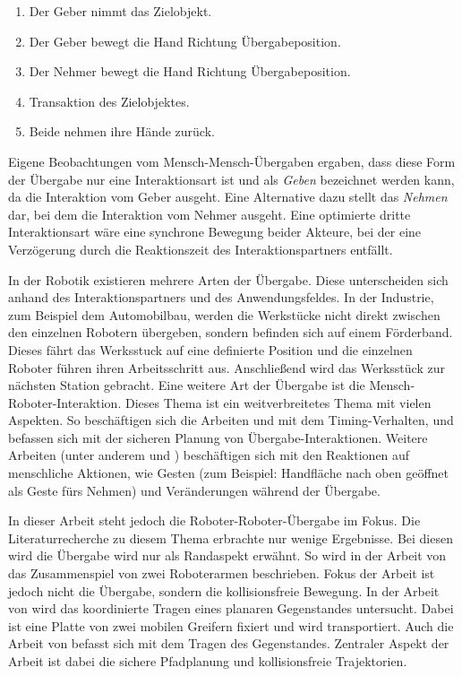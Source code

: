 \begin{enumerate}
	\item Der Geber nimmt das Zielobjekt.
	\item Der Geber bewegt die Hand Richtung Übergabeposition.
	\item Der Nehmer bewegt die Hand Richtung Übergabeposition.
	\item Transaktion des Zielobjektes.
	\item Beide nehmen ihre Hände zurück.
\end{enumerate}

Eigene Beobachtungen vom Mensch-Mensch-Übergaben ergaben, dass diese Form der Übergabe nur eine Interaktionsart ist und als \textit{Geben} bezeichnet werden kann, da die Interaktion vom Geber ausgeht. Eine Alternative dazu stellt das \textit{Nehmen} dar, bei dem die Interaktion vom Nehmer ausgeht. Eine optimierte dritte Interaktionsart wäre eine synchrone Bewegung beider Akteure, bei der eine Verzögerung durch die Reaktionszeit des Interaktionspartners entfällt.

In der Robotik existieren mehrere Arten der Übergabe. Diese unterscheiden sich anhand des Interaktionspartners und des Anwendungsfeldes. 
In der Industrie, zum Beispiel dem Automobilbau, werden die Werkstücke nicht direkt zwischen den einzelnen Robotern übergeben, sondern befinden sich auf einem Förderband. Dieses fährt das Werksstuck auf eine definierte Position und die einzelnen Roboter führen ihren Arbeitsschritt aus. Anschließend wird das Werksstück zur nächsten Station gebracht. Eine weitere Art der Übergabe ist die Mensch-Roboter-Interaktion. Dieses Thema ist ein weitverbreitetes Thema mit vielen Aspekten. So beschäftigen sich die Arbeiten \cite{huber2008human} und \cite{shibata1995experimental} mit dem Timing-Verhalten, \cite{mainprice2010planning} und \cite{kulic2005safe} befassen sich mit der sicheren Planung von Übergabe-Interaktionen. Weitere Arbeiten (unter anderem \cite{prada2014implementation} und \cite{basiliapproach}) beschäftigen sich mit den Reaktionen auf menschliche Aktionen, wie Gesten (zum Beispiel: Handfläche nach oben geöffnet als Geste fürs Nehmen) und Veränderungen während der Übergabe.

In dieser Arbeit steht jedoch die Roboter-Roboter-Übergabe im Fokus. Die Literaturrecherche zu diesem Thema erbrachte nur wenige Ergebnisse. Bei diesen wird die Übergabe wird nur als Randaspekt erwähnt. So wird in der Arbeit von \cite{alford1984coordinated} das Zusammenspiel von zwei Roboterarmen beschrieben. Fokus der Arbeit ist jedoch nicht die Übergabe, sondern die kollisionsfreie Bewegung. In der Arbeit von \cite{pimentel2002development} wird das koordinierte Tragen eines planaren Gegenstandes untersucht. Dabei ist eine Platte von zwei mobilen Greifern fixiert und wird transportiert. Auch die Arbeit von \cite{hernansanz2009optimization} befasst sich mit dem Tragen des Gegenstandes. Zentraler Aspekt der Arbeit ist dabei die sichere Pfadplanung und kollisionsfreie Trajektorien.